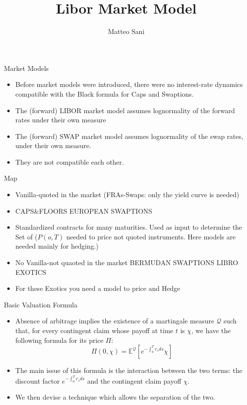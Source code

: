 \documentclass{beamer}
\title{Libor Market Model}
\author{Matteo Sani}
\begin{document}
	\begin{frame}[plain]
		\maketitle
	\end{frame}

\begin{frame}{Market Models}
\begin{itemize}
\item Before market models were introduced, there were no interest-rate dynamics compatible with the Black formula for Caps and Swaptions.
\item The (forward) LIBOR market model assumes lognormality of the forward rates under their own measure
\item The (forward) SWAP market model assumes lognormality of the swap rates, under their own measure.
\item They are not compatible each other.
\end{itemize}
\end{frame}

\begin{frame}{Map}
\begin{itemize}
\item Vanilla-quoted in the market (FRAs-Swaps: only the yield curve is needed)
\item CAPS\&FLOORS EUROPEAN SWAPTIONS
\item Standardized contracts for many maturities. Used as input to determine the Set of ($P(o,T)$ needed to price not quoted instruments. Here models are needed mainly for hedging.)
\item No Vanilla-not quaoted in the market BERMUDAN SWAPTIONS  LIBRO EXOTICS
\item For these Exotics you need a model to price and Hedge
\end{itemize}
\end{frame}

\begin{frame}{Basic Valuation Formula}
\begin{itemize}
\item Absence of arbitrage implies the existence of a martingale measure $\mathcal{Q}$ such that, for every contingent claim whose payoff at time $t$ is $\chi$, we have the following formula for its price $\Pi$:
\begin{equation}
\Pi(0,\chi) = \mathbb{E}^{\mathcal{Q}}\left[e^{-\int_0^T r_s ds}\chi\right]
\end{equation}
\item The main issue of this formula is the interaction between the two terms: the discount factor $e^{-\int_0^T r_s ds}$ and the contingent claim payoff $\chi$.
\item We then devise a technique which allows the separation of the two.
\end{itemize}
\end{frame}
\end{document}
